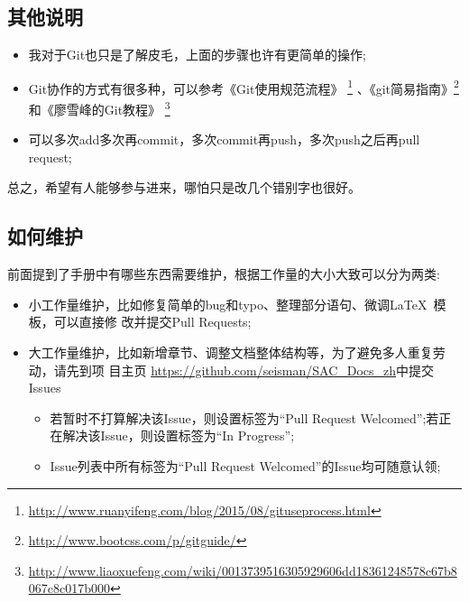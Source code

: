 \subsection{其他说明}
\begin{itemize}
\item 我对于Git也只是了解皮毛，上面的步骤也许有更简单的操作;
\item Git协作的方式有很多种，可以参考《Git使用规范流程》
\footnote{\url{http://www.ruanyifeng.com/blog/2015/08/git­use­process.html}}
、《git简易指南》\footnote{\url{http://www.bootcss.com/p/git­guide/}}
和《廖雪峰的Git教程》
\footnote{\url{http://www.liaoxuefeng.com/wiki/0013739516305929606dd18361248578c67b8067c8c017b000}}
\item 可以多次add多次再commit，多次commit再push，多次push之后再pull request;
\end{itemize}
总之，希望有人能够参与进来，哪怕只是改几个错别字也很好。
\subsection{如何维护}
前面提到了手册中有哪些东西需要维护，根据工作量的大小大致可以分为两类:
\begin{itemize}
\item 小工作量维护，比如修复简单的bug和typo、整理部分语句、微调\LaTeX~模板，可以直接修
改并提交Pull Requests;
\item 大工作量维护，比如新增章节、调整文档整体结构等，为了避免多人重复劳动，请先到项
目主页 \url{https://github.com/seisman/SAC_Docs_zh}中提交Issues
\begin{itemize}
\item 若暂时不打算解决该Issue，则设置标签为“Pull Request Welcomed”;若正在解决该Issue，则设置标签为“In Progress”;
\item Issue列表中所有标签为“Pull Request Welcomed”的Issue均可随意认领;
\end{itemize}
\end{itemize}
